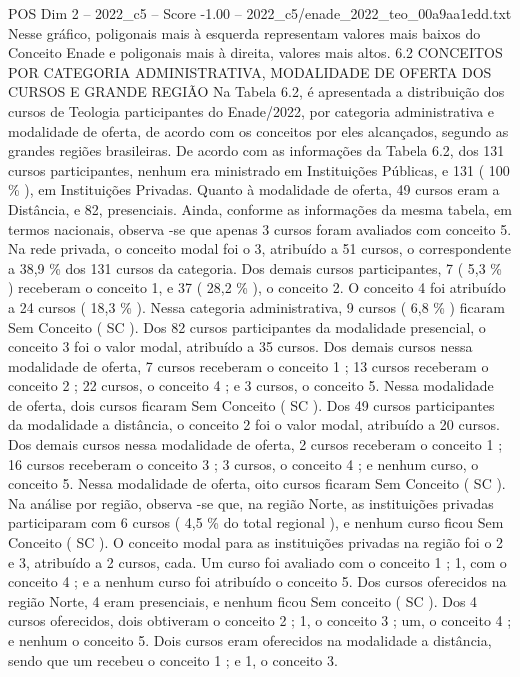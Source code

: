 \begin{textsample}{POS Dim 2 – 2022\_c5 – Score -1.00 – 2022\_c5/enade\_2022\_teo\_00a9aa1edd.txt}
Nesse gráfico, poligonais mais à esquerda representam valores mais baixos do Conceito Enade e poligonais mais à direita, valores mais altos. 6.2 CONCEITOS POR CATEGORIA ADMINISTRATIVA, MODALIDADE DE OFERTA DOS CURSOS E GRANDE REGIÃO Na Tabela 6.2, é apresentada a distribuição dos cursos de Teologia participantes do Enade/2022, por categoria administrativa e modalidade de oferta, de acordo com os conceitos por eles alcançados, segundo as grandes regiões brasileiras.
De acordo com as informações da Tabela 6.2, dos 131 cursos participantes, nenhum era ministrado em Instituições Públicas, e 131 ( 100 \% ), em Instituições Privadas.
Quanto à modalidade de oferta, 49 cursos eram a Distância, e 82, presenciais.
Ainda, conforme as informações da mesma tabela, em termos nacionais, observa -se que apenas 3 cursos foram avaliados com conceito 5.
Na rede privada, o conceito modal foi o 3, atribuído a 51 cursos, o correspondente a 38,9 \% dos 131 cursos da categoria.
Dos demais cursos participantes, 7 ( 5,3 \% ) receberam o conceito 1, e 37 ( 28,2 \% ), o conceito 2.
O conceito 4 foi atribuído a 24 cursos ( 18,3 \% ).
Nessa categoria administrativa, 9 cursos ( 6,8 \% ) ficaram Sem Conceito ( SC ).
Dos 82 cursos participantes da modalidade presencial, o conceito 3 foi o valor modal, atribuído a 35 cursos.
Dos demais cursos nessa modalidade de oferta, 7 cursos receberam o conceito 1 ; 13 cursos receberam o conceito 2 ; 22 cursos, o conceito 4 ; e 3 cursos, o conceito 5.
Nessa modalidade de oferta, dois cursos ficaram Sem Conceito ( SC ).
Dos 49 cursos participantes da modalidade a distância, o conceito 2 foi o valor modal, atribuído a 20 cursos.
Dos demais cursos nessa modalidade de oferta, 2 cursos receberam o conceito 1 ; 16 cursos receberam o conceito 3 ; 3 cursos, o conceito 4 ; e nenhum curso, o conceito 5.
Nessa modalidade de oferta, oito cursos ficaram Sem Conceito ( SC ).
Na análise por região, observa -se que, na região Norte, as instituições privadas participaram com 6 cursos ( 4,5 \% do total regional ), e nenhum curso ficou Sem Conceito ( SC ).
O conceito modal para as instituições privadas na região foi o 2 e 3, atribuído a 2 cursos, cada.
Um curso foi avaliado com o conceito 1 ; 1, com o conceito 4 ; e a nenhum curso foi atribuído o conceito 5.
Dos cursos oferecidos na região Norte, 4 eram presenciais, e nenhum ficou Sem conceito ( SC ).
Dos 4 cursos oferecidos, dois obtiveram o conceito 2 ; 1, o conceito 3 ; um, o conceito 4 ; e nenhum o conceito 5.
Dois cursos eram oferecidos na modalidade a distância, sendo que um recebeu o conceito 1 ; e 1, o conceito 3.

\end{textsample}
